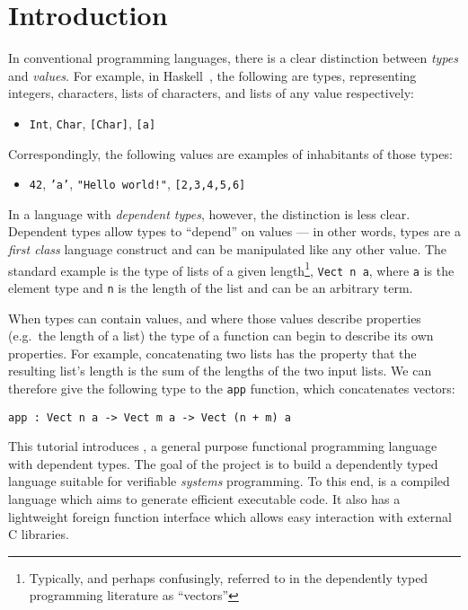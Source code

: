 \section{Introduction}

In conventional programming languages, there is a clear distinction between \emph{types} and \emph{values}.
For example, in Haskell~\cite{haskell-report}, the following are types, representing integers, characters, lists of characters, and lists of any value respectively:

\begin{itemize}
\item \texttt{Int}, \texttt{Char}, \texttt{[Char]}, \texttt{[a]}
\end{itemize}

\noindent
Correspondingly, the following values are examples of inhabitants of those types:

\begin{itemize}
\item \texttt{42}, \texttt{'a'}, \texttt{"Hello world!"}, \texttt{[2,3,4,5,6]}
\end{itemize}

\noindent
In a language with \emph{dependent types}, however, the distinction is less clear.  
Dependent types allow types to ``depend'' on values --- in other words, types are a \emph{first class} language construct and can be manipulated like any other value.
The standard example is the type of lists of a given length\footnote{Typically, and perhaps confusingly, referred to in the dependently typed programming literature as ``vectors''}, \texttt{Vect n a}, where \texttt{a} is the element type and \texttt{n} is the length of the list and can be an arbitrary term.

When types can contain values, and where those values describe properties (e.g.\ the length of a list) the type of a function can begin to describe its own properties.
For example, concatenating two lists has the property that the resulting list's length is the sum of the lengths of the two input lists. We can therefore give the following type to the \texttt{app} function, which concatenates vectors: 

\begin{lstlisting}
app : Vect n a -> Vect m a -> Vect (n + m) a
\end{lstlisting}

\noindent
This tutorial introduces \Idris{}, a general purpose functional  programming language with dependent types.
The goal of the \Idris{} project is to build a dependently typed language suitable for verifiable \emph{systems} programming. To this end, \Idris{} is a compiled language which aims to generate efficient executable code.
It also has a lightweight foreign function interface which allows easy interaction with external C libraries.

